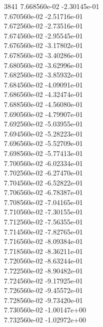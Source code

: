 3841	7.668560e-02	-2.30145e-01	\\ 	7.670560e-02	-2.51716e-01	\\ 	7.672560e-02	-2.73516e-01	\\ 	7.674560e-02	-2.95545e-01	\\ 	7.676560e-02	-3.17802e-01	\\ 	7.678560e-02	-3.40286e-01	\\ 	7.680560e-02	-3.62996e-01	\\ 	7.682560e-02	-3.85932e-01	\\ 	7.684560e-02	-4.09091e-01	\\ 	7.686560e-02	-4.32474e-01	\\ 	7.688560e-02	-4.56080e-01	\\ 	7.690560e-02	-4.79907e-01	\\ 	7.692560e-02	-5.03955e-01	\\ 	7.694560e-02	-5.28223e-01	\\ 	7.696560e-02	-5.52709e-01	\\ 	7.698560e-02	-5.77413e-01	\\ 	7.700560e-02	-6.02334e-01	\\ 	7.702560e-02	-6.27470e-01	\\ 	7.704560e-02	-6.52822e-01	\\ 	7.706560e-02	-6.78387e-01	\\ 	7.708560e-02	-7.04165e-01	\\ 	7.710560e-02	-7.30155e-01	\\ 	7.712560e-02	-7.56355e-01	\\ 	7.714560e-02	-7.82765e-01	\\ 	7.716560e-02	-8.09384e-01	\\ 	7.718560e-02	-8.36211e-01	\\ 	7.720560e-02	-8.63244e-01	\\ 	7.722560e-02	-8.90482e-01	\\ 	7.724560e-02	-9.17925e-01	\\ 	7.726560e-02	-9.45572e-01	\\ 	7.728560e-02	-9.73420e-01	\\ 	7.730560e-02	-1.00147e+00	\\ 	7.732560e-02	-1.02972e+00	\\ \hline
